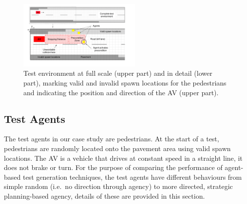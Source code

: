 \documentclass[letterpaper, 10 pt, journal, twoside]{IEEEtran}
\begin{document}



\begin{figure}[!t]
	\centering
\includegraphics[width=0.54\textwidth]{RoadLayout.pdf}
	\caption{Test environment at full scale (upper part) and in detail (lower part), marking valid and invalid spawn locations for the pedestrians and indicating the position and direction of the AV (upper part).}
	\label{gridRoad}
\end{figure}


\subsection{Test Agents}

The test agents in our case study are pedestrians. 
%
At the start of a test, pedestrians are randomly located onto the pavement area using valid spawn locations. The AV is a vehicle that drives at constant speed in a straight line, it does not brake or turn. For the purpose of comparing the performance of agent-based test generation techniques, the test agents have different behaviours from simple random (i.e.\ no direction through agency) to more directed, strategic planning-based agency, details of these are provided in this section.
\end{document}
